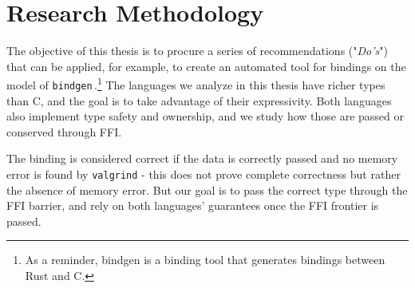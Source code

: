 \documentclass[nomenclature, english, bibtex]{kththesis}
\newcommand*{\generalExpl}[1]{\todo[inline]{#1}}
\newcommand*{\sweExpl}[1]{\todo[inline, backgroundcolor=kth-lightblue40]{#1}}  %
\begin{document}
\section{Research Methodology}
The objective of this thesis is to procure a series of recommendations ("\textit{Do's}") that can be applied, for example, to create an automated tool for bindings on the model of \texttt{bindgen}\,\cite{noauthor_bindgen_2022}.\footnote{As a reminder, bindgen is a binding tool that generates bindings between Rust and C.} 
The languages we analyze in this thesis have richer types than C, and the goal is to take advantage of their expressivity. Both languages also implement type safety and ownership, and we study how those are passed or conserved through \gls{FFI}.

The binding is considered correct if the data is correctly passed and no memory error is found by \texttt{valgrind} - this does not prove complete correctness but rather the absence of memory error. But our goal is to pass the correct type through the \gls{FFI} barrier, and rely on both languages' guarantees once the \gls{FFI} frontier is passed. 
\end{document}
